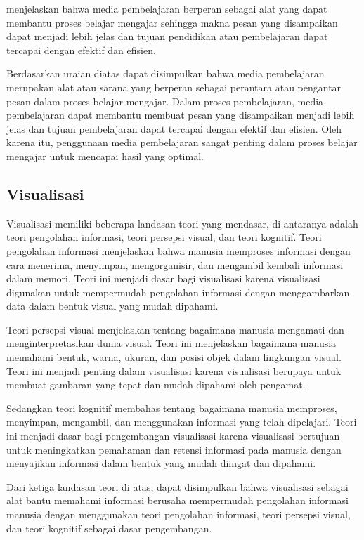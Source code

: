 \textcite{nurrita2018pengembangan} menjelaskan bahwa media pembelajaran berperan sebagai alat yang dapat membantu proses belajar mengajar sehingga makna pesan yang disampaikan dapat menjadi lebih jelas dan tujuan pendidikan atau pembelajaran dapat tercapai dengan efektif dan efisien.

Berdasarkan uraian diatas dapat disimpulkan bahwa media pembelajaran merupakan alat atau sarana yang berperan sebagai perantara atau pengantar pesan dalam proses belajar mengajar. Dalam proses pembelajaran, media pembelajaran dapat membantu membuat pesan yang disampaikan menjadi lebih jelas dan tujuan pembelajaran dapat tercapai dengan efektif dan efisien. Oleh karena itu, penggunaan media pembelajaran sangat penting dalam proses belajar mengajar untuk mencapai hasil yang optimal.

\subsection{Visualisasi}
Visualisasi memiliki beberapa landasan teori yang mendasar, di antaranya adalah teori pengolahan informasi, teori persepsi visual, dan teori kognitif. Teori pengolahan informasi menjelaskan bahwa manusia memproses informasi dengan cara menerima, menyimpan, mengorganisir, dan mengambil kembali informasi dalam memori. Teori ini menjadi dasar bagi visualisasi karena visualisasi digunakan untuk mempermudah pengolahan informasi dengan menggambarkan data dalam bentuk visual yang mudah dipahami.

Teori persepsi visual menjelaskan tentang bagaimana manusia mengamati dan menginterpretasikan dunia visual. Teori ini menjelaskan bagaimana manusia memahami bentuk, warna, ukuran, dan posisi objek dalam lingkungan visual. Teori ini menjadi penting dalam visualisasi karena visualisasi berupaya untuk membuat gambaran yang tepat dan mudah dipahami oleh pengamat.

Sedangkan teori kognitif membahas tentang bagaimana manusia memproses, menyimpan, mengambil, dan menggunakan informasi yang telah dipelajari. Teori ini menjadi dasar bagi pengembangan visualisasi karena visualisasi bertujuan untuk meningkatkan pemahaman dan retensi informasi pada manusia dengan menyajikan informasi dalam bentuk yang mudah diingat dan dipahami.

Dari ketiga landasan teori di atas, dapat disimpulkan bahwa visualisasi sebagai alat bantu memahami informasi berusaha mempermudah pengolahan informasi manusia dengan menggunakan teori pengolahan informasi, teori persepsi visual, dan teori kognitif sebagai dasar pengembangan.

